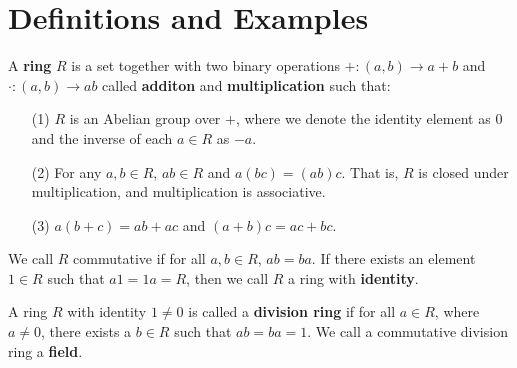 \section{Definitions and Examples}
\label{section_5.1}

\begin{definition}
  A \textbf{ring} $R$ is a set together with two binary operations  $+:(a,b)
  \xrightarrow{} a+b$ and $\cdot:(a,b) \xrightarrow{} ab$ called
  \textbf{additon} and \textbf{multiplication} such that:
  \begin{enumerate}
    \item[(1)] $R$ is an Abelian group over $+$, where we denote the
      identity element as $0$ and the inverse of each $a \in R$ as $-a$.

    \item[(2)] For any $a,b \in R$,  $ab \in R$ and $a(bc)=(ab)c$. That is,
      $R$ is closed under multiplication, and  multiplication is
      associative.

    \item[(3)] $a(b+c)=ab+ac$ and $(a+b)c=ac+bc$.
  \end{enumerate}
  We call $R$ commutative if for all $a,b \in R$, $ab=ba$. If there
  exists an element $1 \in R$ such that  $a1=1a=R$, then we call $R$ a
  ring with  \textbf{identity}.
\end{definition}

\begin{definition}
  A ring $R$ with identity $1 \neq 0$ is called a \textbf{division ring} if
  for all $a \in R$, where  $a \neq 0$, there exists a  $b \in R$ such that
  $ab=ba=1$. We call a commutative division ring a \textbf{field}.
\end{definition}


